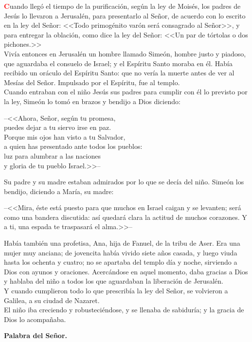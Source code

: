 \documentclass[12pt, letterpaper]{report}
\begin{document}
\lettrine[lines=1]{\bfseries \textcolor{red}{C}}{}\Large uando lleg\'o el tiempo de la purificaci\'on, seg\'un la ley de Mois\'es, los padres de Jes\'us lo llevaron a Jerusal\'en, para presentarlo al Se\~nor, de acuerdo con lo escrito en la ley del Se\~nor: <<Todo primog\'enito var\'on ser\'a consagrado al Se\~nor>>, y para entregar la oblaci\'on, como dice la ley del Se\~nor: <<Un par de t\'ortolas o dos pichones.>>\\
Viv\'ia entonces en Jerusal\'en un hombre llamado Sime\'on, hombre justo y piadoso, que aguardaba el consuelo de Israel; y el Esp\'iritu Santo moraba en \'el. Hab\'ia recibido un or\'aculo del Esp\'iritu Santo: que no ver\'ia la muerte antes de ver al Mes\'ias del Se\~nor. Impulsado por el Esp\'iritu, fue al templo.\\
Cuando entraban con el ni\~no Jes\'us sus padres para cumplir con \'el lo previsto por la ley, Sime\'on lo tom\'o en brazos y bendijo a Dios diciendo:

--<<Ahora, Se\~nor, seg\'un tu promesa,\\
puedes dejar a tu siervo irse en paz.\\
Porque mis ojos han visto a tu Salvador,\\
a quien has presentado ante todos los pueblos:\\
luz para alumbrar a las naciones\\
y gloria de tu pueblo Israel.>>--

Su padre y su madre estaban admirados por lo que se dec\'ia del ni\~no. Sime\'on los bendijo, diciendo a Mar\'ia, su madre:

--<<Mira, \'este est\'a puesto para que muchos en Israel caigan y se levanten; ser\'a como una bandera discutida: as\'i quedar\'a clara la actitud de muchos corazones. Y a ti, una espada te traspasar\'a el alma.>>--

Hab\'ia tambi\'en una profetisa, Ana, hija de Fanuel, de la tribu de Aser. Era una mujer muy anciana; de jovencita hab\'ia vivido siete a\~nos casada, y luego viuda hasta los ochenta y cuatro; no se apartaba del templo d\'ia y noche, sirviendo a Dios con ayunos y oraciones. Acerc\'andose en aquel momento, daba gracias a Dios y hablaba del ni\~no a todos los que aguardaban la liberaci\'on de Jerusal\'en.\\
Y cuando cumplieron todo lo que prescrib\'ia la ley del Se\~nor, se volvieron a Galilea, a su ciudad de Nazaret.\\
El ni\~no iba creciendo y robusteci\'endose, y se llenaba de sabidur\'ia; y la gracia de Dios lo acompa\~naba.

{\bfseries Palabra del Se\~nor.}
\end{document}
